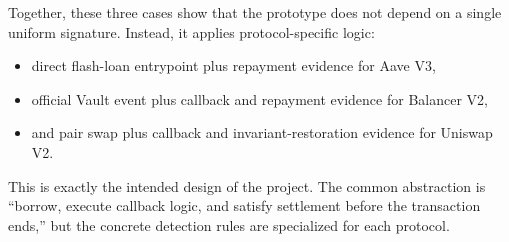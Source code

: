 Together, these three cases show that the prototype does not depend on a single uniform signature. Instead, it applies protocol-specific logic:

\begin{itemize}[leftmargin=1.5em]
    \item direct flash-loan entrypoint plus repayment evidence for Aave V3,
    \item official Vault event plus callback and repayment evidence for Balancer V2,
    \item and pair swap plus callback and invariant-restoration evidence for Uniswap V2.
\end{itemize}

This is exactly the intended design of the project. The common abstraction is ``borrow, execute callback logic, and satisfy settlement before the transaction ends,'' but the concrete detection rules are specialized for each protocol.
